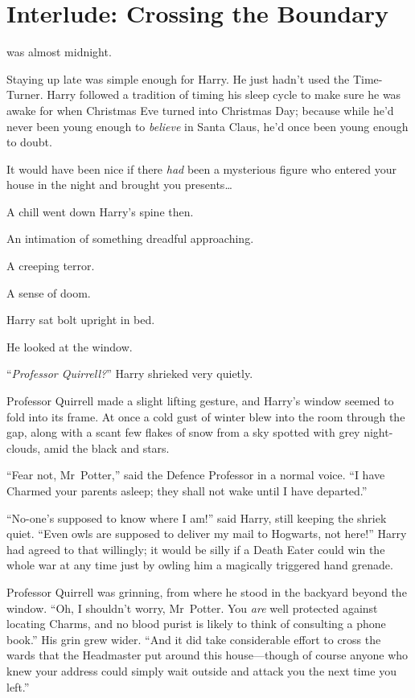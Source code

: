 \chapter{Interlude: Crossing the Boundary}

 was almost midnight.

\hplettrineextrapara
Staying up late was simple enough for Harry. He just hadn’t used the Time-Turner. Harry followed a tradition of timing his sleep cycle to make sure he was awake for when Christmas Eve turned into Christmas Day; because while he’d never been young enough to \emph{believe} in Santa Claus, he’d once been young enough to doubt.

It would have been nice if there \emph{had} been a mysterious figure who entered your house in the night and brought you presents…

A chill went down Harry’s spine then.

An intimation of something dreadful approaching.

A creeping terror.

A sense of doom.

Harry sat bolt upright in bed.

He looked at the window.

“\emph{Professor Quirrell?}” Harry shrieked very quietly.

Professor Quirrell made a slight lifting gesture, and Harry’s window seemed to fold into its frame. At once a cold gust of winter blew into the room through the gap, along with a scant few flakes of snow from a sky spotted with grey night-clouds, amid the black and stars.

“Fear not, Mr~Potter,” said the Defence Professor in a normal voice.
“I have Charmed your parents asleep; they shall not wake until I have departed.”

“No-one’s supposed to know where I am!” said Harry, still keeping the shriek quiet.
“Even owls are supposed to deliver my mail to Hogwarts, not here!” Harry had agreed to that willingly; it would be silly if a Death Eater could win the whole war at any time just by owling him a magically triggered hand grenade.

Professor Quirrell was grinning, from where he stood in the backyard beyond the window.
“Oh, I shouldn’t worry, Mr~Potter. You \emph{are} well protected against locating Charms, and no blood purist is likely to think of consulting a phone book.” His grin grew wider.
“And it did take considerable effort to cross the wards that the Headmaster put around this house—though of course anyone who knew your address could simply wait outside and attack you the next time you left.”

